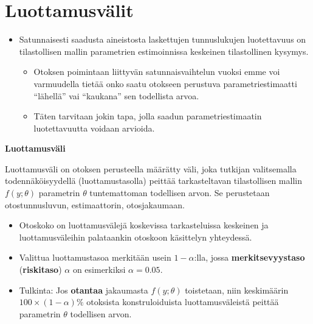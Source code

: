 \documentclass[
]{book}
\providecommand{\tightlist}{%
  \setlength{\itemsep}{0pt}\setlength{\parskip}{0pt}}
\begin{document}
\hypertarget{alaluku91}{%
\section{Luottamusvälit}\label{alaluku91}}

\begin{itemize}
\tightlist
\item
  Satunnaisesti saadusta aineistosta laskettujen tunnuslukujen luotettavuus on tilastollisen mallin parametrien estimoinnissa keskeinen tilastollinen kysymys.

  \begin{itemize}
  \tightlist
  \item
    Otoksen poimintaan liittyvän satunnaisvaihtelun vuoksi emme voi varmuudella tietää onko saatu otokseen perustuva parametriestimaatti ``lähellä'' vai ``kaukana'' sen todellista arvoa.
  \item
    Täten tarvitaan jokin tapa, jolla saadun parametriestimaatin luotettavuutta voidaan arvioida.
  \end{itemize}
\end{itemize}

\begin{defblock}{}
\textbf{Luottamusväli}

Luottamusväli on otoksen perusteella määrätty väli, joka tutkijan valitsemalla todennäköisyydellä (luottamustasolla) peittää tarkasteltavan tilastollisen mallin \(f(y;\theta)\) parametrin \(\theta\) tuntemattoman todellisen arvon. Se perustetaan otostunnusluvun, estimaattorin, otosjakaumaan.

\end{defblock}

\begin{itemize}
\item
  Otoskoko on luottamusvälejä koskevissa tarkasteluissa keskeinen ja luottamusväleihin palataankin otoskoon käsittelyn yhteydessä.
\item
  Valittua luottamustasoa merkitään usein \(1-\alpha\):lla, jossa \textbf{merkitsevyystaso} (\textbf{riskitaso}) \(\alpha\) on esimerkiksi \(\alpha=0.05\).
\item
  Tulkinta: Jos \textbf{otantaa} jakaumasta \(f(y;\theta)\) toistetaan, niin keskimäärin \(100 \times (1-\alpha)\%\) otoksista konstruloiduista luottamusväleistä peittää parametrin \(\theta\) todellisen arvon.
\end{itemize}
\end{document}
